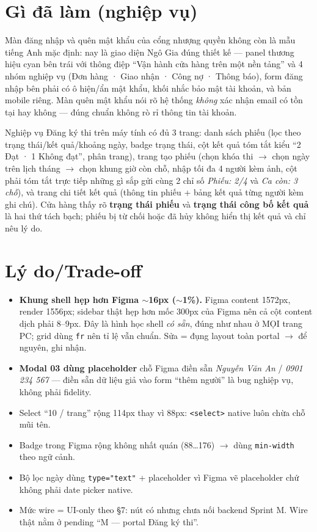 \section{Gì đã làm (nghiệp vụ)}

Màn đăng nhập và quên mật khẩu của cổng nhượng quyền không còn là mẫu tiếng Anh mặc định: nay là giao diện
Ngô Gia đúng thiết kế --- panel thương hiệu cyan bên trái với thông điệp ``Vận hành cửa hàng trên một nền
tảng'' và 4 nhóm nghiệp vụ (Đơn hàng · Giao nhận · Công nợ · Thông báo), form đăng nhập bên phải có ô hiện/ẩn
mật khẩu, khối nhắc bảo mật tài khoản, và bản mobile riêng. Màn quên mật khẩu nói rõ hệ thống \emph{không}
xác nhận email có tồn tại hay không --- đúng chuẩn không rò rỉ thông tin tài khoản.

Nghiệp vụ Đăng ký thi trên máy tính có đủ 3 trang: danh sách phiếu (lọc theo trạng thái/kết quả/khoảng ngày,
badge trạng thái, cột kết quả tóm tắt kiểu ``2 Đạt · 1 Không đạt'', phân trang), trang tạo phiếu (chọn khóa
thi $\to$ chọn ngày trên lịch tháng $\to$ chọn khung giờ còn chỗ, nhập tối đa 4 người kèm ảnh, cột phải tóm
tắt trực tiếp những gì sắp gửi cùng 2 chỉ số \emph{Phiếu: 2/4} và \emph{Ca còn: 3 chỗ}), và trang chi tiết
kết quả (thông tin phiếu + bảng kết quả từng người kèm ghi chú). Cửa hàng thấy rõ \textbf{trạng thái phiếu}
và \textbf{trạng thái công bố kết quả} là hai thứ tách bạch; phiếu bị từ chối hoặc đã hủy không hiển thị kết
quả và chỉ nêu lý do.

\section{Lý do/Trade-off}

\begin{itemize}
  \item \textbf{Khung shell hẹp hơn Figma $\sim$16px ($\sim$1\%).} Figma content 1572px, render 1556px;
    sidebar thật hẹp hơn mốc 300px của Figma nên cả cột content dịch phải 8--9px. Đây là hình học shell
    \emph{có sẵn}, đúng như nhau ở MỌI trang PC; grid dùng \texttt{fr} nên tỉ lệ vẫn chuẩn. Sửa =
    đụng layout toàn portal $\to$ để nguyên, ghi nhận.
  \item \textbf{Modal 03 dùng placeholder} chỗ Figma điền sẵn \emph{Nguyễn Văn An} / \emph{0901 234 567} ---
    điền sẵn dữ liệu giả vào form ``thêm người'' là bug nghiệp vụ, không phải fidelity.
  \item Select ``10 / trang'' rộng 114px thay vì 88px: \texttt{<select>} native luôn chừa chỗ mũi tên.
  \item Badge trong Figma rộng không nhất quán (88\ldots176) $\to$ dùng \texttt{min-width} theo ngữ cảnh.
  \item Bộ lọc ngày dùng \texttt{type="text"} + placeholder vì Figma vẽ placeholder chứ không phải date
    picker native.
  \item Mức wire = UI-only theo §7: nút có nhưng chưa nối backend Sprint M. Wire thật nằm ở pending ``M ---
    portal Đăng ký thi''.
\end{itemize}

